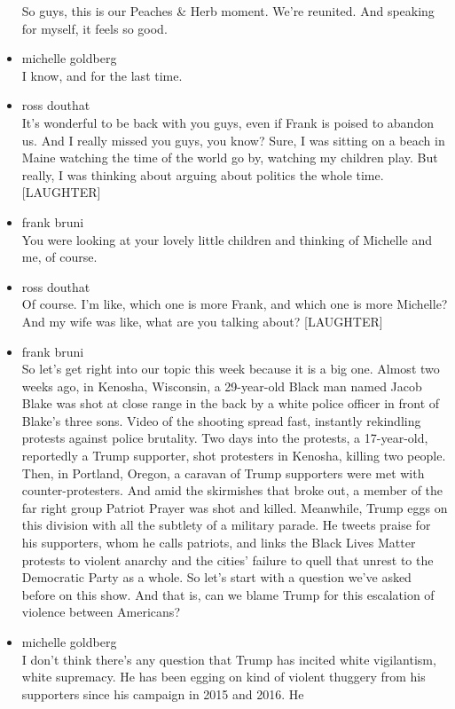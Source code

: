 \begin{itemize}
  So guys, this is our Peaches \& Herb moment. We're reunited. And
  speaking for myself, it feels so good.
\item
  michelle goldberg\\
  I know, and for the last time.
\item
  ross douthat\\
  It's wonderful to be back with you guys, even if Frank is poised to
  abandon us. And I really missed you guys, you know? Sure, I was
  sitting on a beach in Maine watching the time of the world go by,
  watching my children play. But really, I was thinking about arguing
  about politics the whole time. {[}LAUGHTER{]}
\item
  frank bruni\\
  You were looking at your lovely little children and thinking of
  Michelle and me, of course.
\item
  ross douthat\\
  Of course. I'm like, which one is more Frank, and which one is more
  Michelle? And my wife was like, what are you talking about?
  {[}LAUGHTER{]}
\item
  frank bruni\\
  So let's get right into our topic this week because it is a big one.
  Almost two weeks ago, in Kenosha, Wisconsin, a 29-year-old Black man
  named Jacob Blake was shot at close range in the back by a white
  police officer in front of Blake's three sons. Video of the shooting
  spread fast, instantly rekindling protests against police brutality.
  Two days into the protests, a 17-year-old, reportedly a Trump
  supporter, shot protesters in Kenosha, killing two people. Then, in
  Portland, Oregon, a caravan of Trump supporters were met with
  counter-protesters. And amid the skirmishes that broke out, a member
  of the far right group Patriot Prayer was shot and killed. Meanwhile,
  Trump eggs on this division with all the subtlety of a military
  parade. He tweets praise for his supporters, whom he calls patriots,
  and links the Black Lives Matter protests to violent anarchy and the
  cities' failure to quell that unrest to the Democratic Party as a
  whole. So let's start with a question we've asked before on this show.
  And that is, can we blame Trump for this escalation of violence
  between Americans?
\item
  michelle goldberg\\
  I don't think there's any question that Trump has incited white
  vigilantism, white supremacy. He has been egging on kind of violent
  thuggery from his supporters since his campaign in 2015 and 2016. He

\end{itemize}
